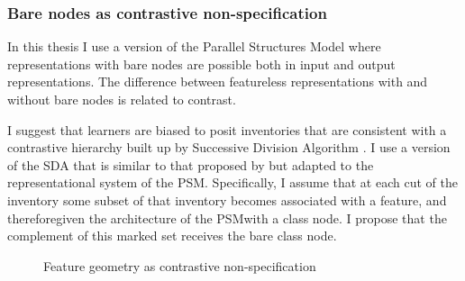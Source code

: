 \subsubsection{Bare nodes as contrastive non\hyp specification}
\label{sec:bare-nodes-as}

In this thesis I use a version of the Parallel Structures Model where representations with bare nodes are possible both in input and output representations. The difference between featureless representations with and without bare nodes is related to contrast.

I suggest that learners are biased to posit inventories that are consistent with a contrastive hierarchy built up by  Successive Division Algorithm \citep[§7.8]{dresher09}. I use a version of the SDA that is similar to that proposed by \citet{ghini01:_asymm_miogl,ghini01:_place} but adapted to the representational system of the PSM. Specifically, I assume that at each cut of the inventory some subset of that inventory becomes associated with a feature, and therefore\dash  given the architecture of the PSM\dash with a class node. I propose that the complement of this marked set receives the bare class node.

\begin{figure}[htp]
  \centering\setlength\level{15mm}
  \caption{Feature geometry as contrastive non\hyp specification}
\label{fig:contrastive-hierarchy-psm}
\end{figure}

